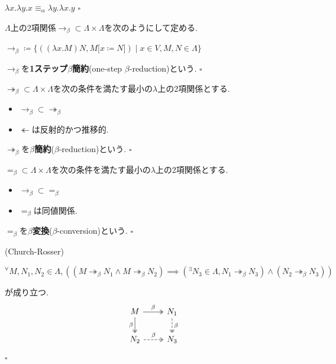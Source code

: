 \begin{example}
$\lambda x.\lambda y.x \equiv_\alpha \lambda y.\lambda x.y$
\hfill $\square$
\end{example}

\begin{definition}
$\Lambda$上の2項関係$\to_\beta \subset \Lambda \times \Lambda$を次のようにして定める.
\begin{center}
    $\to_\beta \coloneq \{((\lambda x.M)N, M \lbrack x \coloneq N \rbrack) \mid x \in V, M, N \in \Lambda\}$
\end{center}
$\to_\beta$を\textbf{1ステップ$\beta$簡約}(one-step $\beta$-reduction)という.
\hfill $\square$
\end{definition}

\begin{definition}
$\twoheadrightarrow_\beta \subset \Lambda \times \Lambda$を次の条件を満たす最小の$\lambda$上の2項関係とする.
\begin{itemize}
    \item $\to_\beta \subset \twoheadrightarrow_\beta$
    \item $\twoheadleftarrow$は反射的かつ推移的.
\end{itemize}

$\twoheadrightarrow_\beta$を\textbf{$\beta$簡約}($\beta$-reduction)という.
\hfill $\square$
\end{definition}

\begin{definition}
$=_\beta \subset \Lambda \times \Lambda$を次の条件を満たす最小の$\lambda$上の2項関係とする.
\begin{itemize}
    \item $\to_\beta \subset =_\beta$
    \item $=_\beta$は同値関係.
\end{itemize}
$=_\beta$を\textbf{$\beta$変換}($\beta$-conversion)という.
\hfill $\square$
\end{definition}

\begin{theorem} (Church-Rosser)
\begin{center}
${^{\forall}}M, N_1, N_2 \in \Lambda, ((M \twoheadrightarrow_\beta N_1 \land M \twoheadrightarrow_\beta N_2) \implies ({^{\exists}}N_3 \in \Lambda, N_1 \twoheadrightarrow_\beta N_3) \land (N_2 \twoheadrightarrow_\beta N_3))$
\end{center}
が成り立つ.
\[\begin{tikzcd}
	M & {N_1} \\
	{N_2} & {N_3}
	\arrow["\beta", two heads, from=1-1, to=1-2]
	\arrow["\beta"', two heads, from=1-1, to=2-1]
	\arrow["\beta", dashed, two heads, from=1-2, to=2-2]
	\arrow["\beta", dashed, two heads, from=2-1, to=2-2]
\end{tikzcd}\]
\hfill $\square$
\end{theorem}